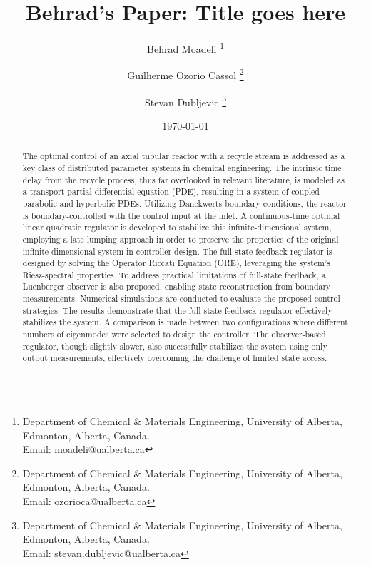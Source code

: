 \documentclass[letterpaper,11pt]{article}
\title{Behrad's Paper: Title goes here}
\author{
  Behrad Moadeli \thanks{Department of Chemical \& Materials Engineering, University of Alberta, Edmonton, Alberta, Canada. \\Email: moadeli@ualberta.ca} \and
  Guilherme Ozorio Cassol \thanks{Department of Chemical \& Materials Engineering, University of Alberta, Edmonton, Alberta, Canada. \\Email: ozorioca@ualberta.ca} \and
  Stevan Dubljevic \thanks{Department of Chemical \& Materials Engineering, University of Alberta, Edmonton, Alberta, Canada. \\Email: stevan.dubljevic@ualberta.ca}
}
\date{\today}
\begin{document}
\maketitle

\begin{abstract}
    The optimal control of an axial tubular reactor with a recycle stream is addressed as a key class of distributed parameter systems in chemical engineering. The intrinsic time delay from the recycle process, thus far overlooked in relevant literature, is modeled as a transport partial differential equation (PDE), resulting in a system of coupled parabolic and hyperbolic PDEs. Utilizing Danckwerts boundary conditions, the reactor is boundary-controlled with the control input at the inlet. A continuous-time optimal linear quadratic regulator is developed to stabilize this infinite-dimensional system, employing a late lumping approach in order to preserve the properties of the original infinite dimensional system in controller design. The full-state feedback regulator is designed by solving the Operator Riccati Equation (ORE), leveraging the system's Riesz-spectral properties. To address practical limitations of full-state feedback, a Luenberger observer is also proposed, enabling state reconstruction from boundary measurements. 
    Numerical simulations are conducted to evaluate the proposed control strategies. The results demonstrate that the full-state feedback regulator effectively stabilizes the system. A comparison is made between two configurations where different numbers of eigenmodes were selected to design the controller. The observer-based regulator, though slightly slower, also successfully stabilizes the system using only output measurements, effectively overcoming the challenge of limited state access.
\end{abstract}

\newpage
\tableofcontents
\newpage


  
  
  
  
  
    
  

  
  
  \newpage
  \printbibliography



\end{document}
